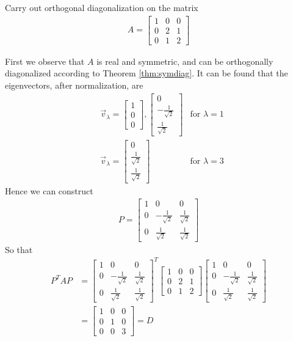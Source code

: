 \begin{exmp}
\label{exmp:orthodiag}
Carry out orthogonal diagonalization on the matrix
\begin{align*}
A =
\begin{bmatrix}
1 & 0 & 0 \\
0 & 2 & 1 \\
0 & 1 & 2
\end{bmatrix}
\end{align*}
\end{exmp}
\begin{solution}
First we observe that $A$ is real and symmetric, and can be orthogonally diagonalized according to Theorem \ref{thm:symdiag}. It can be found that the eigenvectors, after normalization, are
\begin{align*}
&\vec{v}_\lambda = 
\begin{bmatrix}
1 \\
0 \\
0
\end{bmatrix},
\begin{bmatrix}
0 \\
-\frac{1}{\sqrt{2}} \\
\frac{1}{\sqrt{2}}
\end{bmatrix}
& \text{for } \lambda = 1 \\
&\vec{v}_\lambda = 
\begin{bmatrix}
0 \\
\frac{1}{\sqrt{2}} \\
\frac{1}{\sqrt{2}}
\end{bmatrix}
& \text{for } \lambda = 3
\end{align*}
Hence we can construct
\begin{align*}
P =
\begin{bmatrix}
1 & 0 & 0 \\
0 & -\frac{1}{\sqrt{2}} & \frac{1}{\sqrt{2}} \\
0 & \frac{1}{\sqrt{2}} & \frac{1}{\sqrt{2}}
\end{bmatrix}
\end{align*}
So that
\begin{align*}
P^TAP &=
\begin{bmatrix}
1 & 0 & 0 \\
0 & -\frac{1}{\sqrt{2}} & \frac{1}{\sqrt{2}} \\
0 & \frac{1}{\sqrt{2}} & \frac{1}{\sqrt{2}}
\end{bmatrix}^T
\begin{bmatrix}
1 & 0 & 0 \\
0 & 2 & 1 \\
0 & 1 & 2
\end{bmatrix}
\begin{bmatrix}
1 & 0 & 0 \\
0 & -\frac{1}{\sqrt{2}} & \frac{1}{\sqrt{2}} \\
0 & \frac{1}{\sqrt{2}} & \frac{1}{\sqrt{2}}
\end{bmatrix} \\
&= 
\begin{bmatrix}
1 & 0 & 0\\
0 & 1 & 0\\
0 & 0 & 3 
\end{bmatrix} = D
\end{align*}
\end{solution}
